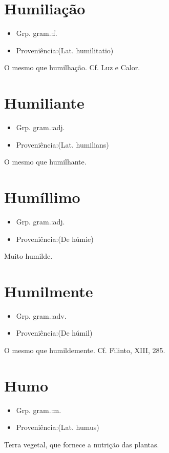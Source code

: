 \documentclass{article}
\begin{document}
\section{Humiliação}
\begin{itemize}
\item {Grp. gram.:f.}
\end{itemize}
\begin{itemize}
\item {Proveniência:(Lat. \textunderscore humilitatio\textunderscore )}
\end{itemize}
O mesmo que \textunderscore humilhação\textunderscore . Cf. \textunderscore Luz e Calor\textunderscore .
\section{Humiliante}
\begin{itemize}
\item {Grp. gram.:adj.}
\end{itemize}
\begin{itemize}
\item {Proveniência:(Lat. \textunderscore humilians\textunderscore )}
\end{itemize}
O mesmo que \textunderscore humilhante\textunderscore .
\section{Humíllimo}
\begin{itemize}
\item {Grp. gram.:adj.}
\end{itemize}
\begin{itemize}
\item {Proveniência:(De \textunderscore húmie\textunderscore )}
\end{itemize}
Muito humilde.
\section{Humilmente}
\begin{itemize}
\item {Grp. gram.:adv.}
\end{itemize}
\begin{itemize}
\item {Proveniência:(De \textunderscore húmil\textunderscore )}
\end{itemize}
O mesmo que \textunderscore humildemente\textunderscore . Cf. Filinto, XIII, 285.
\section{Humo}
\begin{itemize}
\item {Grp. gram.:m.}
\end{itemize}
\begin{itemize}
\item {Proveniência:(Lat. \textunderscore humus\textunderscore )}
\end{itemize}
Terra vegetal, que fornece a nutrição das plantas.
\end{document}
